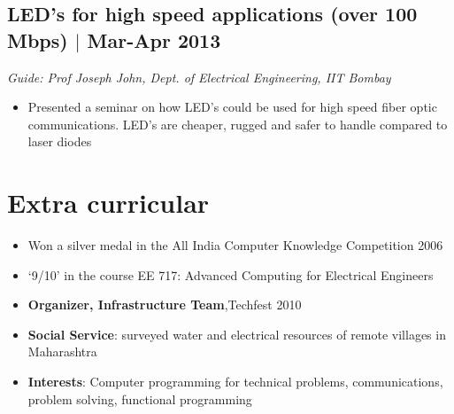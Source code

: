 \documentclass[11pt]{article}
\begin{document}
\subsection*{LED's for high speed applications (over 100 Mbps) $\vert$  Mar-Apr 2013}
\emph{Guide: Prof Joseph John, Dept. of Electrical Engineering, IIT Bombay}  
\begin{itemize}  
\item Presented a seminar on how LED's could be used for high speed fiber optic communications. LED's are cheaper, rugged and safer to handle compared to laser diodes 
\end{itemize}

\section*{Extra curricular}
\begin{itemize}
\item Won a silver medal in the All India Computer Knowledge Competition 2006 
\item `9/10' in the course EE 717: Advanced Computing for Electrical Engineers 
\item \textbf{Organizer, Infrastructure Team},Techfest 2010 
\item \textbf{Social Service}: surveyed water and electrical resources of remote villages in Maharashtra 
\item \textbf{Interests}:  Computer programming for technical problems, communications, problem solving, functional programming 
\end{itemize}
\end{document}
